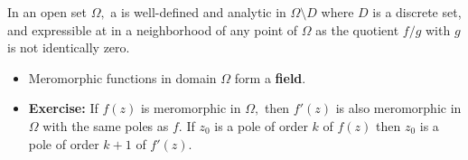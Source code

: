 \documentclass[a4paper,12pt]{article}
\begin{document}
\begin{definition}
    In an open set $\Omega,$ a  is well-defined and analytic in $\Omega\setminus D$ where $D$ is a discrete set, and expressible at in a neighborhood of any point of $\Omega$ as the quotient $f/g$ with $g$ is not identically zero. 
\end{definition}
\begin{itemize}
    \item Meromorphic functions in domain $\Omega$ form a \textbf{field}.
    \item \textbf{Exercise:} If $f(z)$ is meromorphic in $\Omega,$ then $f'(z)$ is also meromorphic in $\Omega$ with the same poles as $f.$ If $z_0$ is a pole of order $k$ of $f(z)$ then $z_0$ is a pole of order $k+1$ of $f'(z)$.
\end{itemize}
\end{document}
